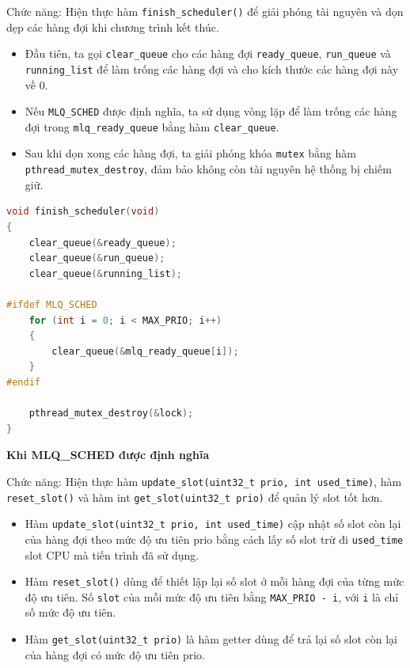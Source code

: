 
Chức năng: Hiện thực hàm \texttt{finish\_scheduler()} để giải phóng tài nguyên và dọn dẹp các hàng đợi khi chương trình kết thúc.

\begin{itemize}
    \item Đầu tiên, ta gọi \texttt{clear\_queue} cho các hàng đợi \texttt{ready\_queue}, \texttt{run\_queue} và \texttt{running\_list} để làm trống các hàng đợi và cho kích thước các hàng đợi này về 0.
    \item Nếu \texttt{MLQ\_SCHED} được định nghĩa, ta sử dụng vòng lặp để làm trống các hàng đợi trong \texttt{mlq\_ready\_queue} bằng hàm \texttt{clear\_queue}.
    \item Sau khi dọn xong các hàng đợi, ta giải phóng khóa \texttt{mutex} bằng hàm \texttt{pthread\_mutex\_destroy}, đảm bảo không còn tài nguyên hệ thống bị chiếm giữ.
\end{itemize}

\begin{lstlisting}[style=Cstyle,language=C]
void finish_scheduler(void)
{
    clear_queue(&ready_queue);
    clear_queue(&run_queue);
    clear_queue(&running_list);

#ifdef MLQ_SCHED
    for (int i = 0; i < MAX_PRIO; i++)
    {
        clear_queue(&mlq_ready_queue[i]);
    }
#endif

    pthread_mutex_destroy(&lock);
}
\end{lstlisting}



\textbf{Khi MLQ\_SCHED được định nghĩa}


Chức năng: Hiện thực hàm \texttt{update\_slot(uint32\_t prio, int used\_time)}, hàm \texttt{reset\_slot()} và hàm int \texttt{get\_slot(uint32\_t prio)} để quản lý slot tốt hơn.

\begin{itemize}
    \item Hàm \texttt{update\_slot(uint32\_t prio, int used\_time)} cập nhật số slot còn lại của hàng đợi theo mức độ ưu tiên prio bằng cách lấy số slot trừ đi \texttt{used\_time} slot CPU mà tiến trình đã sử dụng.
    \item Hàm \texttt{reset\_slot()} dùng để thiết lập lại số slot ở mỗi hàng đợi của từng mức độ ưu tiên. Số \texttt{slot} của mỗi mức độ ưu tiên bằng \texttt{MAX\_PRIO - i}, với \texttt{i} là chỉ số mức độ ưu tiên.
    \item Hàm \texttt{get\_slot(uint32\_t prio)} là hàm getter dùng để trả lại số slot còn lại của hàng đợi có mức độ ưu tiên prio.
\end{itemize}

